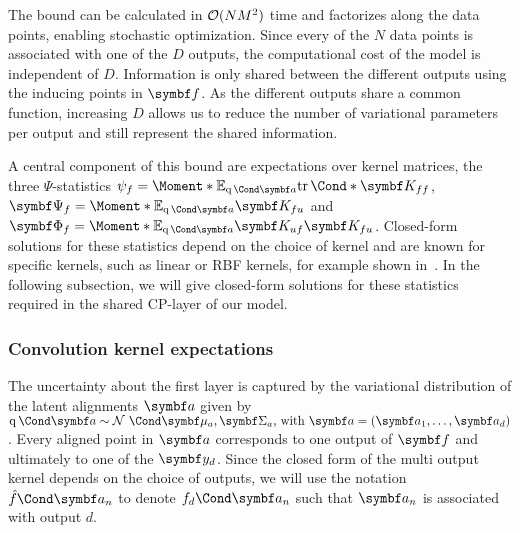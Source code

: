 The bound can be calculated in $\operatorname{\mathcal{O}}(NM^2)$ time and factorizes along the data points, enabling stochastic optimization.
Since every of the $N$ data points is associated with one of the $D$ outputs, the computational cost of the model is independent of $D$.
Information is only shared between the different outputs using the inducing points in $\mat{f}$.
As the different outputs share a common function, increasing $D$ allows us to reduce the number of variational parameters per output and still represent the shared information.

A central component of this bound are expectations over kernel matrices, the three $\Psi$-statistics $\psi_f = \Moment*{\E_{\Variat{\rv{a}}}}{\Fun*{\tr}{\mat{K_{ff}}}}$, $\mat{\Psi_f} = \Moment*{\E_{\Variat{\rv{a}}}}{\mat{K_{fu}}}$ and $\mat{\Phi_f} = \Moment*{\E_{\Variat{\rv{a}}}}{\mat{K_{uf}}\mat{K_{fu}}}$.
Closed-form solutions for these statistics depend on the choice of kernel and are known for specific kernels, such as linear or RBF kernels, for example shown in~\parencite{damianou_deep_2013}.
In the following subsection, we will give closed-form solutions for these statistics required in the shared CP-layer of our model.

\subsubsection{Convolution kernel expectations}
The uncertainty about the first layer is captured by the variational distribution of the latent alignments $\rv{a}$ given by $\Variat{\rv{a}} \sim \Gaussian{\mat{\mu}_a, \mat{\Sigma}_a}\text{, with } \rv{a} = \left( \rv{a}_1, \dots, \rv{a}_d \right)$.
Every aligned point in $\rv{a}$ corresponds to one output of $\rv{f}$ and ultimately to one of the $\rv{y}_d$.
Since the closed form of the multi output kernel depends on the choice of outputs, we will use the notation $\Fun{\hat{f}}{\rv{a}_n}$ to denote $\Fun{f_d}{\rv{a}_n}$ such that $\rv{a}_n$ is associated with output $d$.


